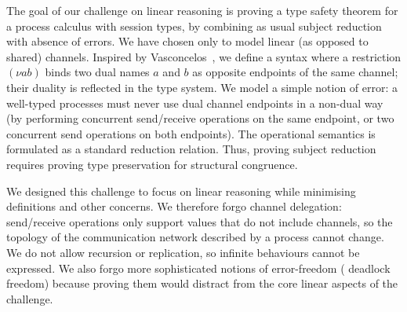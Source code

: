 \documentclass[runningheads]{llncs}
\begin{document}
The goal of our challenge on linear reasoning is proving a type safety theorem
for a process calculus with session types, by combining as usual subject
reduction with absence of errors.  We have chosen  only to model linear (as
opposed to shared) channels. Inspired by Vasconcelos~\cite{Vasconcelos2012}, we
define a syntax where a restriction $(\nu ab)$ binds two dual names $a$
and $b$ as opposite endpoints of the same channel; their duality is
reflected in the type system. We model a simple notion of error: a well-typed
processes must never use dual channel endpoints in a non-dual way (\eg by
performing concurrent send/receive operations on the same endpoint, or two
concurrent send operations on both endpoints).
The operational semantics is formulated as a standard reduction relation. Thus,
proving subject reduction requires proving type preservation for structural
congruence.

We designed this challenge to focus on linear reasoning while minimising
definitions and other concerns.  We therefore forgo channel delegation:
send/receive operations only support values that do not include channels, so
the topology of the communication network described by a process cannot change.
We do not allow recursion or replication, so infinite behaviours cannot be
expressed. We also forgo more sophisticated notions of error-freedom (\eg
deadlock freedom) because proving them would distract from the core linear
aspects of the challenge.
\end{document}
